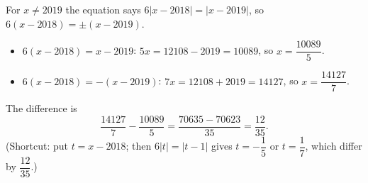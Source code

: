 For $x\ne2019$ the equation says $6|x-2018|=|x-2019|$, so $6(x-2018)=\pm(x-2019)$.
\begin{itemize}
\item $6(x-2018)=x-2019$: $5x=12108-2019=10089$, so $x=\dfrac{10089}{5}$.
\item $6(x-2018)=-(x-2019)$: $7x=12108+2019=14127$, so $x=\dfrac{14127}{7}$.
\end{itemize}
The difference is
\[
\dfrac{14127}{7}-\dfrac{10089}{5}=\dfrac{70635-70623}{35}=\boxed{\dfrac{12}{35}}.
\]
(Shortcut: put $t=x-2018$; then $6|t|=|t-1|$ gives $t=-\dfrac{1}{5}$ or $t=\dfrac{1}{7}$, which differ by $\dfrac{12}{35}$.)
